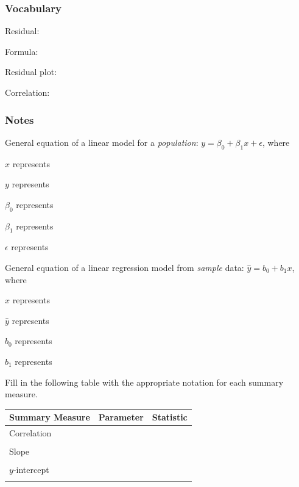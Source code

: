 \documentclass[
]{report}
\newcommand{\rgs}{\vspace{12pt}} %
\newcommand{\rgi}{\hspace{24pt}}  %
\begin{document}

\hypertarget{vocabulary-5}{%
\subsubsection*{Vocabulary}\label{vocabulary-5}}

Residual:
\rgs

\rgi Formula:
\rgs

Residual plot:
\rgs

Correlation:
\rgs

\hypertarget{notes-7}{%
\subsubsection*{Notes}\label{notes-7}}

General equation of a linear model for a \emph{population}: \(y= \beta_0+ \beta_1 x+\epsilon\), where

\rgi \(x\) represents
\rgs

\rgi \(y\) represents
\rgs

\rgi \(\beta_0\) represents
\rgs

\rgi \(\beta_1\) represents
\rgs

\rgi \(\epsilon\) represents
\rgs

General equation of a linear regression model from \emph{sample} data: \(\hat{y}= b_0+ b_1 x\), where

\rgi \(x\) represents
\rgs

\rgi \(\hat{y}\) represents
\rgs

\rgi \(b_0\) represents
\rgs

\rgi \(b_1\) represents
\rgs

Fill in the following table with the appropriate notation for each summary measure.

\begin{center}
\begin{tabular}{|l|p{2in}|p{2in}|} \hline
Summary Measure & Parameter & Statistic \\ \hline
Correlation & & \\ 
& & \\ \hline
Slope & & \\ 
& & \\ \hline
$y$-intercept & & \\ 
& & \\ \hline
\end{tabular}
\end{center}
\end{document}
